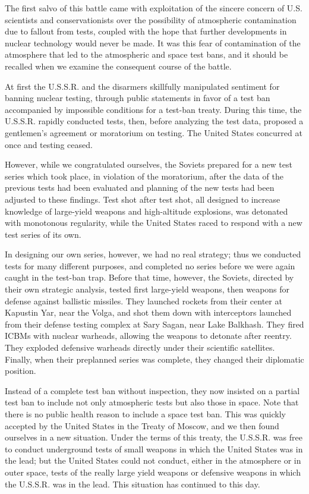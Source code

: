 The first salvo of this battle came with exploitation of the sincere concern of U.S. scientists and conservationists over the possibility of atmospheric contamination due to fallout from tests, coupled with the hope that further developments in nuclear technology would never be made. It was this fear of contamination of the atmosphere that led to the atmospheric and space test bans, and it should be recalled when we examine the consequent course of the battle.

At first the U.S.S.R. and the disarmers skillfully manipulated sentiment for banning nuclear testing, through public statements in favor of a test ban accompanied by impossible conditions for a test-ban treaty. During this time, the U.S.S.R. rapidly conducted tests, then, before analyzing the test data, proposed a gentlemen's agreement or moratorium on testing. The United States concurred at once and testing ceased.

However, while we congratulated ourselves, the Soviets prepared for a new test series which took place, in violation of the moratorium, after the data of the previous tests had been evaluated and planning of the new tests had been adjusted to these findings. Test shot after test shot, all designed to increase knowledge of large-yield weapons and high-altitude explosions, was detonated with monotonous regularity, while the United States raced to respond with a new test series of its own.

In designing our own series, however, we had no real strategy; thus we conducted tests for many different purposes, and completed no series before we were again caught in the test-ban trap. Before that time, however, the Soviets, directed by their own strategic analysis, tested first large-yield weapons, then weapons for defense against ballistic missiles. They launched rockets from their center at Kapustin Yar, near the Volga, and shot them down with interceptors launched from their defense testing complex at Sary Sagan, near Lake Balkhash. They fired ICBMs with nuclear warheads, allowing the weapons to detonate after reentry. They exploded defensive warheads directly under their scientific satellites. Finally, when their preplanned series was complete, they changed their diplomatic position.

Instead of a complete test ban without inspection, they now insisted on a partial test ban to include not only atmospheric tests but also those in space. Note that there is no public health reason to include a space test ban. This was quickly accepted by the United States in the Treaty of Moscow, and we then found ourselves in a new situation. Under the terms of this treaty, the U.S.S.R. was free to conduct underground tests of small weapons in which the United States was in the lead; but the United States could not conduct, either in the atmosphere or in outer space, tests of the really large yield weapons or defensive weapons in which the U.S.S.R. was in the lead. This situation has continued to this day.


